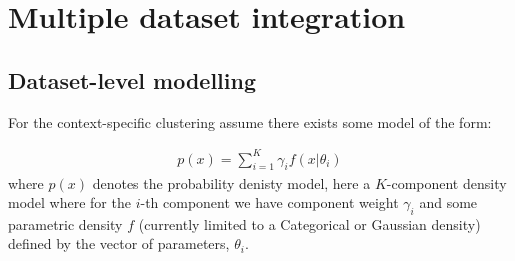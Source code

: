 \documentclass[fleqn,11pt]{wlscirep}
\begin{document}
\section{Multiple dataset integration}
%
%

\subsection{Dataset-level modelling}
For the context-specific clustering assume there exists some model of the form:

\begin{align}
p(x) = \sum_{i = 1}^K \gamma_i f(x|\theta_i)
\end{align}
where $p(x)$ denotes the probability denisty model, here a $K$-component density model where for the $i$-th component we have component weight $\gamma_i$ and some parametric density $f$ (currently limited to a Categorical or Gaussian density) defined by the vector of parameters, $\theta_i$.
\end{document}

